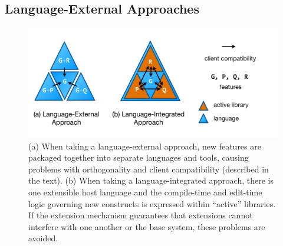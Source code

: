 \subsection{Language-External Approaches}\label{external-approaches}
\begin{figure}
\begin{center}
\includegraphics[scale=.48]{approaches.pdf}
\end{center}
\vspace{-20px}
\caption{\small (a) When taking a language-external approach, new features are packaged together into separate languages and tools, causing problems with orthogonality and client compatibility (described in the text). (b) When taking a language-integrated approach, there is one extensible host language and the compile-time and edit-time logic governing new constructs is expressed within ``active'' libraries. If the extension mechanism guarantees that extensions cannot interfere with one another or the base system, these problems are avoided.}
\label{approaches}
\end{figure}


